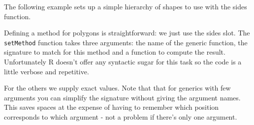 The following example sets up a simple hierarchy of shapes to use with
the sides function.

\begin{Shaded}
\begin{Highlighting}[]
\NormalTok{(}\NormalTok{)}
\NormalTok{(}\NormalTok{, }\NormalTok{(} \NormalTok{), } \NormalTok{)}
\NormalTok{(}\NormalTok{, } \NormalTok{)}
\NormalTok{(}\NormalTok{, } \NormalTok{)}
\NormalTok{(}\NormalTok{, } \NormalTok{)}
\end{Highlighting}
\end{Shaded}

Defining a method for polygons is straightforward: we just use the sides
slot. The \texttt{setMethod} function takes three arguments: the name of
the generic function, the signature to match for this method and a
function to compute the result. Unfortunately R doesn't offer any
syntactic sugar for this task so the code is a little verbose and
repetitive.

\begin{Shaded}
\begin{Highlighting}[]
\NormalTok{(}\NormalTok{, }\NormalTok{(} \NormalTok{), }
\NormalTok{\})}
\end{Highlighting}
\end{Shaded}

For the others we supply exact values. Note that that for generics with
few arguments you can simplify the signature without giving the argument
names. This saves spaces at the expense of having to remember which
position corresponds to which argument - not a problem if there's only
one argument.

\begin{Shaded}
\begin{Highlighting}[]
\NormalTok{(}\NormalTok{, }\NormalTok{(}\NormalTok{), }\NormalTok{)}
\NormalTok{(}\NormalTok{, }\NormalTok{(}\NormalTok{),   }\NormalTok{)}
\NormalTok{(}\NormalTok{, }\NormalTok{(}\NormalTok{),   }\NormalTok{)}
\end{Highlighting}
\end{Shaded}

